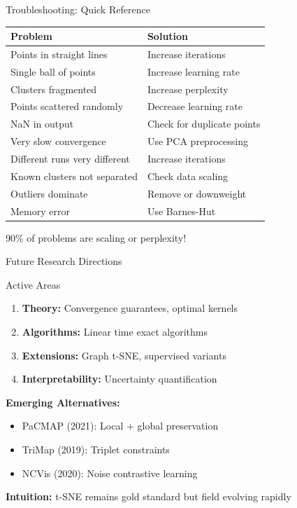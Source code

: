 \documentclass[aspectratio=169]{beamer}
\newcommand{\intuition}[1]{\colorbox{green!10}{\textcolor{intuitioncolor}{\textbf{Intuition:} #1}}}
\begin{document}
\begin{frame}{Troubleshooting: Quick Reference}
\begin{center}
\begin{tabular}{l|l}
\textbf{Problem} & \textbf{Solution}\\
\hline
Points in straight lines & Increase iterations\\
Single ball of points & Increase learning rate\\
Clusters fragmented & Increase perplexity\\
Points scattered randomly & Decrease learning rate\\
NaN in output & Check for duplicate points\\
Very slow convergence & Use PCA preprocessing\\
Different runs very different & Increase iterations\\
Known clusters not separated & Check data scaling\\
Outliers dominate & Remove or downweight\\
Memory error & Use Barnes-Hut
\end{tabular}
\end{center}

\colorbox{yellow!30}{90\% of problems are scaling or perplexity!}
\end{frame}

\begin{frame}{Future Research Directions}
\begin{block}{Active Areas}
\begin{enumerate}
\item \textbf{Theory:} Convergence guarantees, optimal kernels
\item \textbf{Algorithms:} Linear time exact algorithms
\item \textbf{Extensions:} Graph t-SNE, supervised variants
\item \textbf{Interpretability:} Uncertainty quantification
\end{enumerate}
\end{block}

\textbf{Emerging Alternatives:}
\begin{itemize}
\item PaCMAP (2021): Local + global preservation
\item TriMap (2019): Triplet constraints
\item NCVis (2020): Noise contrastive learning
\end{itemize}

\intuition{t-SNE remains gold standard but field evolving rapidly}
\end{frame}
\end{document}
